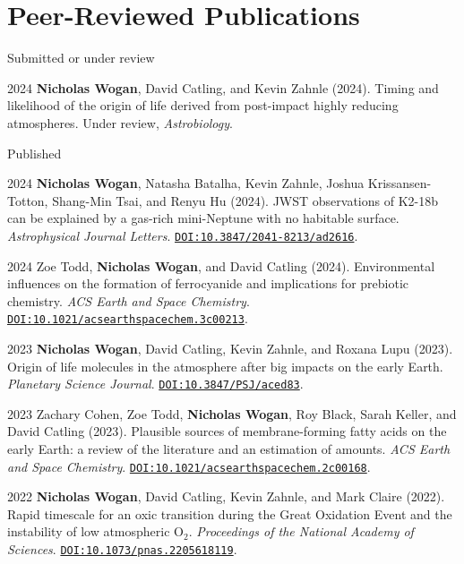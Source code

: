 \documentclass{article}
\begin{document}
\section{Peer-Reviewed Publications}

\noindent Submitted or under review

\begin{cvlist}
\item[2024]
  \textbf{Nicholas Wogan}, David Catling, and Kevin Zahnle (2024). Timing and likelihood of the origin of life derived from post-impact highly reducing atmospheres. Under review, \emph{Astrobiology}.
\end{cvlist}

\noindent Published

\begin{cvlist}
\item[2024]
  \textbf{Nicholas Wogan}, Natasha Batalha, Kevin Zahnle, Joshua Krissansen-Totton, Shang-Min Tsai, and Renyu Hu (2024). JWST observations of K2-18b can be explained by a gas-rich mini-Neptune with no habitable surface. \emph{Astrophysical Journal Letters}. \href{https://doi.org/10.3847/2041-8213/ad2616}{\nolinkurl{DOI:10.3847/2041-8213/ad2616}}.
\item[2024]
  Zoe Todd, \textbf{Nicholas Wogan}, and David Catling (2024). Environmental influences on the formation of ferrocyanide and implications for prebiotic chemistry. \emph{ACS Earth and Space Chemistry}. \href{https://doi.org/10.1021/acsearthspacechem.3c00213}{\nolinkurl{DOI:10.1021/acsearthspacechem.3c00213}}.
\item[2023]
  \textbf{Nicholas Wogan}, David Catling, Kevin Zahnle, and Roxana Lupu (2023). Origin of life molecules in the atmosphere after big impacts on the early Earth. \emph{Planetary Science Journal}. \href{https://doi.org/10.3847/PSJ/aced83}{\nolinkurl{DOI:10.3847/PSJ/aced83}}.
\item[2023]
  Zachary Cohen, Zoe Todd, \textbf{Nicholas Wogan}, Roy Black, Sarah Keller, and David Catling (2023). Plausible sources of membrane-forming fatty acids on the early Earth: a review of the literature and an estimation of amounts. \emph{ACS Earth and Space Chemistry}. \href{https://doi.org/10.1021/acsearthspacechem.2c00168}{\nolinkurl{DOI:10.1021/acsearthspacechem.2c00168}}.
\item[2022]
  \textbf{Nicholas Wogan}, David Catling, Kevin Zahnle, and Mark Claire (2022). Rapid timescale for an oxic transition during the Great Oxidation Event and the instability of low atmospheric O$_2$. \emph{Proceedings of the National Academy of Sciences}. \href{https://doi.org/10.1073/pnas.2205618119}{\nolinkurl{DOI:10.1073/pnas.2205618119}}.

\end{cvlist}
\end{document}
